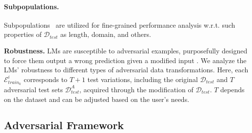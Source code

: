 \documentclass[11pt]{article}
\begin{document}
\paragraph{Subpopulations.} Subpopulations~\cite{goel-etal-2021-robustness} are utilized for fine-grained performance analysis w.r.t. such properties of $\mathcal{D}_{test}$ as length, domain, and others.

\vspace{0.1em}
\noindent\textbf{Robustness.} LMs are susceptible to adversarial examples, purposefully designed to force them output a wrong prediction given a modified input \cite{ebrahimi-etal-2018-hotflip, ijcai2018-585, jia-liang-2017-adversarial}. We analyze the LMs' robustness to different types of adversarial data transformations. Here, each $\mathcal{E}^i_{train_k}$ corresponds to $T+1$ test variations, including the original $\mathcal{D}_{test}$ and $T$ adversarial test sets $\mathcal{D}^{A}_{test}$, acquired through the modification of $\mathcal{D}_{test}$. $T$ depends on the dataset and can be adjusted based on the user's needs. 


\subsection{Adversarial Framework} \label{sec:transformation_framework}
\end{document}
